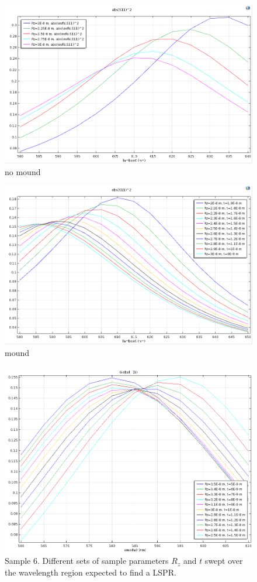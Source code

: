 \begin{figure}[h!]
    \centering
    \includegraphics[width=0.6\linewidth]{figures/Appendix/parameters/Sample6_TM_NoMound_phi0_theta0_wl580-640_Rz20-30_absS11squared.png}
    \caption{no mound}
    \label{fig:S6_Rz_sweep_nomound}
\end{figure}
\begin{figure}[h!]
    \centering
    \includegraphics[width=0.6\linewidth]{figures/Appendix/parameters/Sample6_TM_Mound_phi0_theta55_wl580-650_Rz20-30_t9-19_absS11squared.png}
    \caption{mound}
    \label{fig:S6_Rz_sweep_mound_1}
\end{figure}
\begin{figure}[h!]
    \centering
    \includegraphics[width=0.6\linewidth]{figures/Appendix/parameters/Sample6_TM_Mound_phi0_theta55_wl560-610_Rz25-35_t5-15_absS11squared.png}
    \caption{Sample 6. Different sets of sample parameters $R_z$ and $t$ swept over the wavelength region expected to find a LSPR.}
\end{figure}


